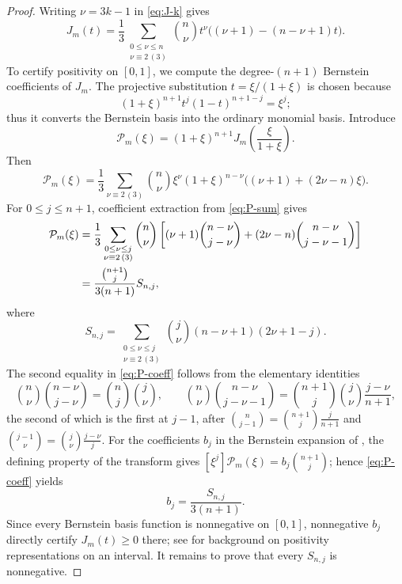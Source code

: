 \documentclass[11pt,a4paper]{amsart}
\numberwithin{equation}{section}
\theoremstyle{plain}
\theoremstyle{definition}
\begin{document}
\begin{proof}
Writing \(\nu=3k-1\) in \eqref{eq:J-k} gives
\[
 J_m(t)=\frac13
 \sum_{\substack{0\le\nu\le n\\\nu\equiv2\, (3)}}
 \binom{n}{\nu} t^\nu\bigl((\nu+1)-(n-\nu+1)t\bigr).
\]
To certify positivity on \([0,1]\), we compute the degree-\((n+1)\)
Bernstein coefficients of \(J_m\).  The projective substitution
\(t=\xi/(1+\xi)\) is chosen because
\[
 (1+\xi)^{n+1}t^j(1-t)^{n+1-j}=\xi^j;
\]
thus it converts the Bernstein basis into the ordinary monomial basis.
Introduce
\begin{equation}\label{eq:P-def}
 \mathcal P_m(\xi)
 =(1+\xi)^{n+1}J_m\!\left(\frac{\xi}{1+\xi}\right).
\end{equation}
Then
\begin{equation}\label{eq:P-sum}
 \mathcal P_m(\xi)
 =\frac13
 \sum_{\nu\equiv2\, (3)}
 \binom{n}{\nu} \xi^\nu(1+\xi)^{n-\nu}
 \bigl((\nu+1)+(2\nu-n)\xi\bigr).
\end{equation}
For \(0\le j\le n+1\), coefficient extraction from \eqref{eq:P-sum} gives
\begin{align}
 [\xi^j]\mathcal P_m(\xi)
 &=\frac13
 \sum_{\substack{0\le\nu\le j\\\nu\equiv2\, (3)}}
 \binom{n}{\nu}
 \left[
 (\nu+1)\binom{n-\nu}{j-\nu}
 +(2\nu-n)\binom{n-\nu}{j-\nu-1}
 \right]\notag\\
 &=\frac{\binom{n+1}{j}}{3(n+1)}S_{n,j},
 \label{eq:P-coeff}
\end{align}
where
\begin{equation}\label{eq:S-def}
 S_{n,j}
 =\sum_{\substack{0\le\nu\le j\\\nu\equiv2\, (3)}}
 \binom{j}{\nu}(n-\nu+1)(2\nu+1-j).
\end{equation}
The second equality in \eqref{eq:P-coeff} follows from the elementary
identities
\[
 \binom{n}{\nu}\binom{n-\nu}{j-\nu}=\binom nj\binom{j}{\nu},
 \qquad
 \binom{n}{\nu}\binom{n-\nu}{j-\nu-1}
 =\binom{n+1}{j}\binom{j}{\nu}\frac{j-\nu}{n+1},
\]
the second of which is the first at \(j-1\), after
\(\binom n{j-1}=\binom{n+1}{j}\frac j{n+1}\) and
\(\binom{j-1}{\nu}=\binom{j}{\nu}\frac{j-\nu}{j}\).
For the coefficients \(b_j\) in the Bernstein expansion of
, the defining property of the transform gives
\([\xi^j]\mathcal P_m(\xi)=b_j\binom{n+1}{j}\); hence \eqref{eq:P-coeff} yields
\[
 b_j=\frac{S_{n,j}}{3(n+1)}.
\]
Since every Bernstein basis function is nonnegative on \([0,1]\), nonnegative
\(b_j\) directly certify \(J_m(t)\ge0\) there; see
\cite{PowersReznick2000PositiveInterval} for background on positivity
representations on an interval.  It remains to prove that every \(S_{n,j}\) is
nonnegative.


\end{proof}
\end{document}
